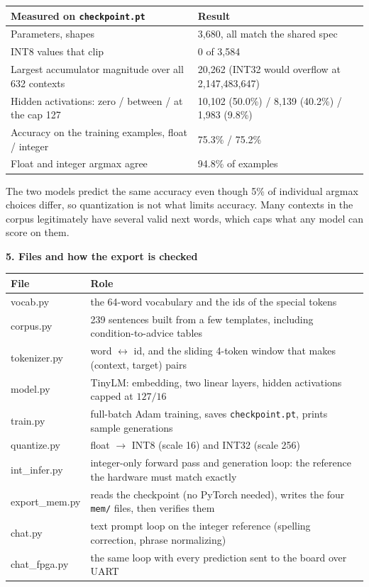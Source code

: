 \documentclass[10pt,a4paper,landscape]{article}
\begin{document}
\medskip
\footnotesize
\begin{center}
\begin{tabular}{@{}p{7.5cm}p{9.5cm}@{}}
\toprule
\textbf{Measured on \texttt{checkpoint.pt}} & \textbf{Result} \\
\midrule
Parameters, shapes & 3,680, all match the shared spec \\
INT8 values that clip & 0 of 3,584 \\
Largest accumulator magnitude over all 632 contexts & 20,262 (INT32 would overflow at 2,147,483,647) \\
Hidden activations: zero / between / at the cap 127 & 10,102 (50.0\%) / 8,139 (40.2\%) / 1,983 (9.8\%) \\
Accuracy on the training examples, float / integer & 75.3\% / 75.2\% \\
Float and integer argmax agree & 94.8\% of examples \\
\bottomrule
\end{tabular}
\end{center}
\small
The two models predict the same accuracy even though 5\% of individual argmax choices differ, so quantization is not what limits accuracy. Many contexts in the corpus legitimately have several valid next words, which caps what any model can score on them.

\clearpage
{\Large\bfseries 5. Files and how the export is checked}

\medskip
\small
\begin{center}
\begin{tabular}{@{}>{\ttfamily}p{3.6cm}p{13.4cm}@{}}
\toprule
\textbf{File} & \textbf{Role} \\
\midrule
vocab.py & the 64-word vocabulary and the ids of the special tokens \\
corpus.py & 239 sentences built from a few templates, including condition-to-advice tables \\
tokenizer.py & word $\leftrightarrow$ id, and the sliding 4-token window that makes (context, target) pairs \\
model.py & TinyLM: embedding, two linear layers, hidden activations capped at $127/16$ \\
train.py & full-batch Adam training, saves \texttt{checkpoint.pt}, prints sample generations \\
quantize.py & float $\to$ INT8 (scale 16) and INT32 (scale 256) \\
int\_infer.py & integer-only forward pass and generation loop: the reference the hardware must match exactly \\
export\_mem.py & reads the checkpoint (no PyTorch needed), writes the four \texttt{mem/} files, then verifies them \\
chat.py & text prompt loop on the integer reference (spelling correction, phrase normalizing) \\
chat\_fpga.py & the same loop with every prediction sent to the board over UART \\
\bottomrule
\end{tabular}
\end{center}
\end{document}
